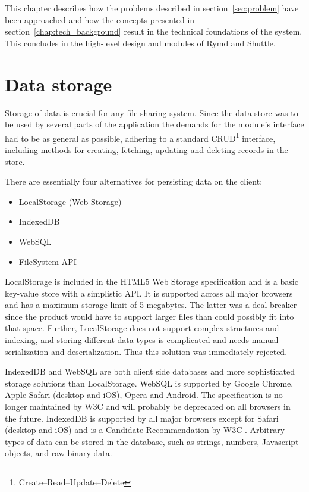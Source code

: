 This chapter describes how the problems described in section~\ref{sec:problem} have been approached and how the concepts presented in section~\ref{chap:tech_background} result in the technical foundations of the system. This concludes in the high-level design and modules of Rymd and Shuttle.



\section{Data storage}
\label{sec:datastorage}
Storage of data is crucial for any file sharing system. Since the data store was to be used by several parts of the application the demands for the module's interface had to be as general as possible, adhering to a standard CRUD\footnote{Create–Read–Update–Delete} interface, including methods for creating, fetching, updating and deleting records in the store.

There are essentially four alternatives for persisting data on the client:

\begin{itemize}
\item LocalStorage (Web Storage)
\item IndexedDB
\item WebSQL
\item FileSystem API
\end{itemize}

LocalStorage is included in the HTML5 Web Storage specification \cite{WebStorage:Online} and is a basic key-value store with a simplistic API. It is supported across all major browsers and has a maximum storage limit of 5 megabytes. The latter was a deal-breaker since the product would have to support larger files than could possibly fit into that space. Further, LocalStorage does not support complex structures and indexing, and storing different data types is complicated and needs manual serialization and deserialization. Thus this solution was immediately rejected.

IndexedDB and WebSQL are both client side databases and more sophisticated storage solutions than LocalStorage. WebSQL is supported by Google Chrome, Apple Safari (desktop and iOS), Opera and Android. The specification is no longer maintained by W3C \cite{WebSQL:Online} and will probably be deprecated on all browsers in the future. IndexedDB is supported by all major browsers except for Safari (desktop and iOS) and is a Candidate Recommendation by W3C \cite{IndexedDB:Online}. Arbitrary types of data can be stored in the database, such as strings, numbers, Javascript objects, and raw binary data.

